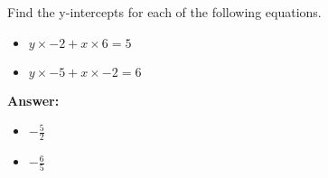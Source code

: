 Find the y-intercepts for each of the following equations. \begin{itemize}\item \( y \times -2 + x \times 6 = 5 \)\item \( y \times -5 + x \times -2 = 6 \)\end{itemize}

        \textbf{Answer:} \begin{itemize}\item \( -\frac{5}{2} \)\item \( -\frac{6}{5} \)\end{itemize}
